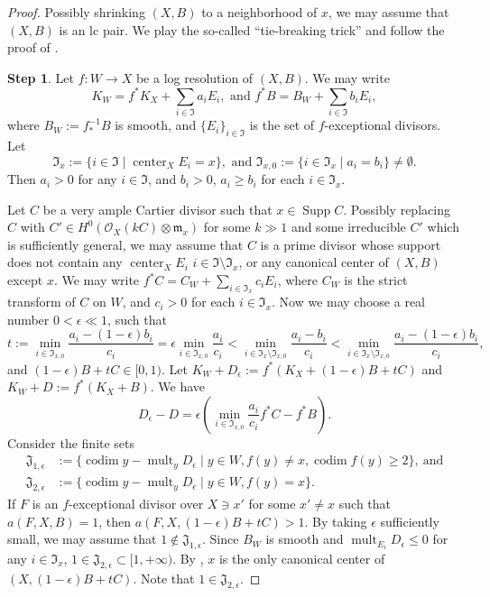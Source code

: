 \documentclass[11pt]{amsart}
\numberwithin{equation}{section}
\newcommand{\Center}{\operatorname{center}}
\newcommand{\Supp}{\operatorname{Supp}}
\newcommand{\mult}{\operatorname{mult}}
\newcommand{\codim}{\operatorname{codim}}
\theoremstyle{definition}
\theoremstyle{definition}
\begin{document}
\begin{proof}
Possibly shrinking $(X,B)$ to a neighborhood of $x$, we may assume that $(X,B)$ is an lc pair. We play the so-called ``tie-breaking trick'' and follow the proof of \cite[Proposition 8.7.1]{Kol07}.

\medskip

\noindent\textbf{Step 1}. Let $f:W\to X$ be a log resolution of $(X,B)$. We may write 
$$K_W=f^{*}K_X+\sum_{i\in \mathfrak{I}} a_iE_i, \text{ and } f^{*}B=B_W+\sum_{i\in \mathfrak{I}} b_iE_i,$$
where $B_W:=f_*^{-1}B$ is smooth, and $\{E_i\}_{i\in \mathfrak{I}}$ is the set of $f$-exceptional divisors. Let 
$$\mathfrak{I}_x:=\{i\in \mathfrak{I}\mid \Center_X E_i=x\}, \text{ and } \mathfrak{I}_{x,0}:=\{i\in \mathfrak{I}_x\mid a_i=b_i\}\neq\emptyset.$$ Then $a_i>0$ for any $i\in \mathfrak{I}$, and $b_i>0$, $a_i\ge b_i$ for each $i\in \mathfrak{I}_x$.


Let $C$ be a very ample Cartier divisor such that $x\in\Supp C$. Possibly replacing $C$ with $C'\in H^0(\mathcal{O}_X(kC)\otimes \mathfrak{m}_x)$ for some $k\gg 1$ and some irreducible $C'$ which is sufficiently general, we may assume that $C$ is a prime divisor whose support does not contain any $\Center_XE_i$ $i\in \mathfrak{I}\setminus \mathfrak{I}_x$, or any canonical center of $(X,B)$ except $x$. We may write $f^{*}C=C_W+\sum_{i\in \mathfrak{I}_x}c_iE_i$, where $C_W$ is the strict transform of $C$ on $W$, and $c_i>0$ for each $i\in \mathfrak{I}_x$. Now we may choose a real number $0<\epsilon\ll 1$, such that
$$t:=\min_{i\in \mathfrak{I}_{x,0}}\frac{a_i-(1-\epsilon)b_i}{c_i}=\epsilon\min_{i\in \mathfrak{I}_{x,0}}\frac{ a_i}{c_i}<\min_{i\in 
\mathfrak{I}_x\setminus \mathfrak{I}_{x,0}}\frac{a_i-b_i}{c_i}<\min_{i\in \mathfrak{I}_x\setminus \mathfrak{I}_{x,0}}\frac{a_i-(1-\epsilon)b_i}{c_i},$$
and $(1-\epsilon)B+tC\in[0,1)$. Let $K_W+D_{\epsilon}:=f^*(K_X+(1-\epsilon)B+tC)$ and $K_W+D:=f^*(K_X+B)$. We have $$D_{\epsilon}-D=\epsilon(\min_{i\in \mathfrak{I}_{x,0}}\frac{ a_i}{c_i}f^*C-f^*B).$$ 
Consider the finite sets
\begin{align*}
    \mathfrak{J}_{1,\epsilon}&:=\{\codim y-\mult_y D_{\epsilon}\mid y\in W, f(y)\neq x,\codim f(y)\geq 2\},~\text{and}\\
    \mathfrak{J}_{2,\epsilon}&:=\{\codim y-\mult_y D_{\epsilon}\mid y\in W, f(y)=x\}.
\end{align*}
If $F$ is an $f$-exceptional divisor over $X\ni x'$ for some $x'\neq x$ such that $a(F,X,B)=1$, then $a(F,X,(1-\epsilon)B+tC)>1$. By taking $\epsilon$ sufficiently small, we may assume that $1\notin \mathfrak{J}_{1,\epsilon}$. Since $B_W$ is smooth and $\mult_{E_i}D_{\epsilon}\le 0$ for any $i\in \mathfrak{I}_x$, $1\in\mathfrak{J}_{2,\epsilon}\subset [1,+\infty)$. By \cite[Lemma~3.3]{CH21}, $x$ is the only canonical center of $(X,(1-\epsilon)B+tC)$. Note that $1\in \mathfrak{J}_{2,\epsilon}$.



\end{proof}
\end{document}
